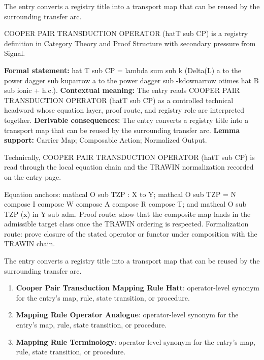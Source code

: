 The entry converts a registry title into a transport map that can be reused by the surrounding transfer arc.
\clearpage


\begingroup\small
{}
COOPER PAIR TRANSDUCTION OPERATOR (hatT sub CP) is a registry definition in Category Theory and Proof Structure with secondary pressure from Signal.

\begingroup\footnotesize\setlength{\emergencystretch}{3em}\sloppy
\textbf{Formal statement:} hat T sub CP = lambda sum sub k (Delta(L) a to the power dagger sub kuparrow a to the power dagger sub -kdownarrow otimes hat B sub ionic + h.c.). \textbf{Contextual meaning:} The entry reads COOPER PAIR TRANSDUCTION OPERATOR (hatT sub CP) as a controlled technical headword whose equation layer, proof route, and registry role are interpreted together. \textbf{Derivable consequences:} The entry converts a registry title into a transport map that can be reused by the surrounding transfer arc. \textbf{Lemma support:} Carrier Map; Composable Action; Normalized Output.\par
\endgroup

Technically, COOPER PAIR TRANSDUCTION OPERATOR (hatT sub CP) is read through the local equation chain and the TRAWIN normalization recorded on the entry page.

Equation anchors: mathcal O sub TZP : X to Y; mathcal O sub TZP = N compose I compose W compose A compose R compose T; and mathcal O sub TZP (x) in Y sub adm. Proof route: show that the composite map lands in the admissible target class once the TRAWIN ordering is respected. Formalization route: prove closure of the stated operator or functor under composition with the TRAWIN chain.

The entry converts a registry title into a transport map that can be reused by the surrounding transfer arc.
\endgroup

\begin{enumerate}[leftmargin=1.6em,itemsep=6pt,topsep=4pt]
\item \textbf{Cooper Pair Transduction Mapping Rule Hatt}: operator-level synonym for the entry's map, rule, state transition, or procedure.
\item \textbf{Mapping Rule Operator Analogue}: operator-level synonym for the entry's map, rule, state transition, or procedure.
\item \textbf{Mapping Rule Terminology}: operator-level synonym for the entry's map, rule, state transition, or procedure.
\end{enumerate}

